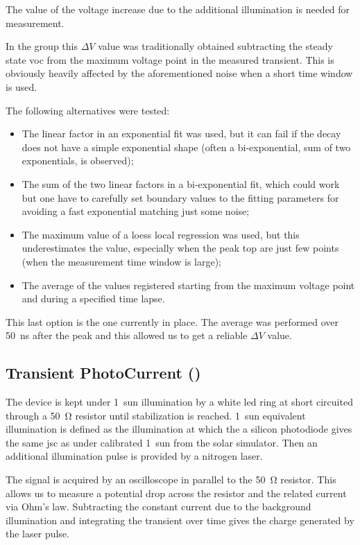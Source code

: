 		\label{tpv_deltaV}

			The value of the voltage increase due to the additional illumination is needed for  measurement.

			In the group this $\Delta V$ value was traditionally obtained subtracting the steady state \gls{voc} from the maximum voltage point in the measured transient. This is obviously heavily affected by the aforementioned noise when a short time window is used.

			The following alternatives were tested:
			\begin{itemize}
				\item The linear factor in an exponential fit was used, but it can fail if the decay does not have a simple exponential shape (often a bi-exponential, sum of two exponentials, is observed);
				\item The sum of the two linear factors in a bi-exponential fit, which could work but one have to carefully set boundary values to the fitting parameters for avoiding a fast exponential matching just some noise;
				\item The maximum value of a \gls{loess} local regression was used, but this underestimates the value, especially when the peak top are just few points (when the measurement time window is large);
				\item The average of the values registered starting from the maximum voltage point and during a specified time lapse.
			\end{itemize}

			This last option is the one currently in place. The average was performed over \SI{50}{ns} after the peak and this allowed us to get a reliable $\Delta V$ value.

	\subsection{Transient PhotoCurrent ()}

		The device is kept under 1~sun illumination by a white \gls{led} ring at short circuited through a \SI{50}{\ohm} resistor until stabilization is reached. 1~sun equivalent illumination is defined as the illumination at which the a silicon photodiode gives the same \gls{jsc} as under calibrated 1~sun from the solar simulator. Then an additional illumination pulse is provided by a nitrogen laser.

		The signal is acquired by an oscilloscope in parallel to the \SI{50}{\ohm} resistor. This allows us to measure a potential drop across the resistor and the related current via Ohm's law. Subtracting the constant current due to the background illumination and integrating the transient over time gives the charge generated by the laser pulse.

